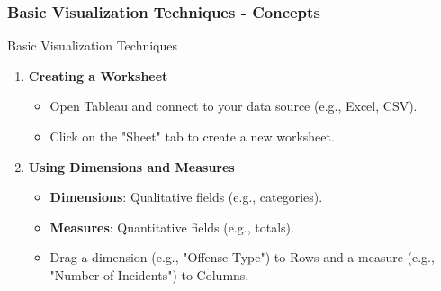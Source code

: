 \documentclass[aspectratio=169]{beamer}
\begin{document}
\begin{frame}[fragile]
    \frametitle{Basic Visualization Techniques - Concepts}
    \begin{block}{Basic Visualization Techniques}
        \begin{enumerate}
            \item \textbf{Creating a Worksheet}
                \begin{itemize}
                    \item Open Tableau and connect to your data source (e.g., Excel, CSV).
                    \item Click on the "Sheet" tab to create a new worksheet.
                \end{itemize}
            \item \textbf{Using Dimensions and Measures}
                \begin{itemize}
                    \item \textbf{Dimensions}: Qualitative fields (e.g., categories).
                    \item \textbf{Measures}: Quantitative fields (e.g., totals).
                    \item Drag a dimension (e.g., "Offense Type") to Rows and a measure (e.g., "Number of Incidents") to Columns.
                \end{itemize}
        \end{enumerate}
    \end{block}
\end{frame}
\end{document}
